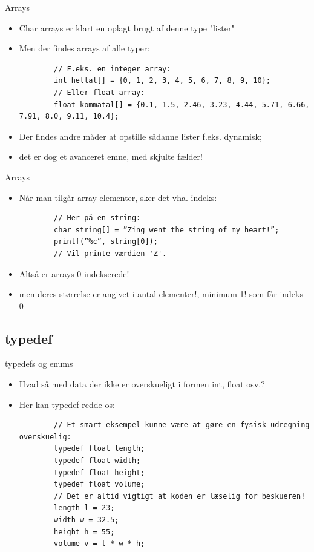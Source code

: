 \documentclass{beamer}
\begin{document}

\begin{frame}[fragile]{Arrays}
	\begin{itemize}
		\item{Char arrays er klart en oplagt brugt af denne type "lister"}
		\item{Men der findes arrays af alle typer:}
		\begin{lstlisting}
		// F.eks. en integer array:
		int heltal[] = {0, 1, 2, 3, 4, 5, 6, 7, 8, 9, 10};
		// Eller float array:
		float kommatal[] = {0.1, 1.5, 2.46, 3.23, 4.44, 5.71, 6.66, 7.91, 8.0, 9.11, 10.4};
		\end{lstlisting}
		\item{Der findes andre måder at opstille sådanne lister f.eks. dynamisk};
		\item{det er dog et avanceret emne, med skjulte fælder!}
		
	\end{itemize}
\end{frame}
		

\begin{frame}[fragile]{Arrays}
	\begin{itemize}
		\item{Når man tilgår array elementer, sker det vha. indeks:}
		\begin{lstlisting}
		// Her på en string:
		char string[] = ”Zing went the string of my heart!”;
		printf(”%c”, string[0]);
		// Vil printe værdien 'Z'. 
		\end{lstlisting}
		\item{Altså er arrays 0-indekserede!}
		\item{men deres størrelse er angivet i antal elementer!, minimum 1! som får indeks 0}
	\end{itemize}
\end{frame}

\subsection{typedef}

\begin{frame}[fragile]{typedefs og enums}
	\begin{itemize}
		\item{Hvad så med data der ikke er overskueligt i formen int, float osv.?}
		\item{Her kan {\color{C_darkblue}typedef} redde os:}
		\begin{lstlisting}
		// Et smart eksempel kunne være at gøre en fysisk udregning overskuelig:
		typedef float length;
		typedef float width;
		typedef float height;
		typedef float volume;
		// Det er altid vigtigt at koden er læselig for beskueren!
		length l = 23;
		width w = 32.5;
		height h = 55;
		volume v = l * w * h;
		\end{lstlisting}
	\end{itemize}
\end{frame}
\end{document}
